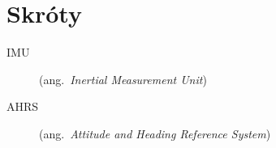 \chapter*{Skróty}\mbox{}
\label{sec:skroty}
\noindent
\begin{description}
  \item [IMU] (ang.\ \emph{Inertial Measurement Unit}) 
  \item [AHRS] (ang.\ \emph{Attitude and Heading Reference System})
\end{description}
